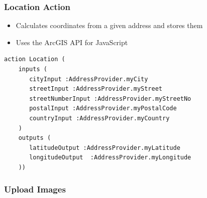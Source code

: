 
\begin{frame}[fragile]
\frametitle{Location Action}

\begin{itemize}
\item Calculates coordinates from a given address and stores them
\item Uses the ArcGIS API for JavaScript
\end{itemize}

\begin{lstlisting}[basicstyle=\footnotesize\ttfamily]
action Location (
    inputs (
       cityInput :AddressProvider.myCity
       streetInput :AddressProvider.myStreet
       streetNumberInput :AddressProvider.myStreetNo
       postalInput :AddressProvider.myPostalCode
       countryInput :AddressProvider.myCountry
    )
    outputs (
       latitudeOutput :AddressProvider.myLatitude
       longitudeOutput  :AddressProvider.myLongitude
    ))		 				
\end{lstlisting}

\end{frame}


\begin{frame}[plain]
\frametitle{Upload Images}
\begin{center}
\end{center}
\end{frame}

